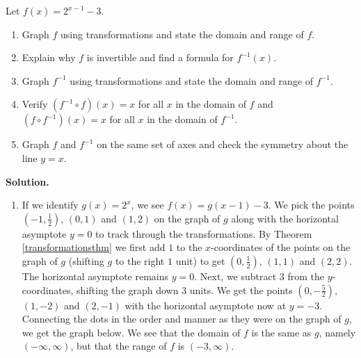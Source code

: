 \begin{ex}  Let $f(x) = 2^{x-1} - 3$. \label{proceduralinverse}

\begin{enumerate}

\item  Graph $f$ using transformations and state the domain and range of $f$.

\item  Explain why $f$ is invertible and find a formula for $f^{-1}(x)$.

\item  Graph $f^{-1}$ using transformations and state the domain and range of $f^{-1}$.

\item  Verify $\left(f^{-1} \circ f\right)(x) = x$ for all $x$ in the domain of $f$ and  $\left(f \circ f^{-1} \right)(x) = x$ for all $x$ in the domain of $f^{-1}$.

\item  Graph $f$ and $f^{-1}$ on the same set of axes and check the symmetry about the line $y = x$.

\end{enumerate}

{\bf Solution.}  

\begin{enumerate}

\item  If we identify $g(x) = 2^{x}$, we see $f(x) = g(x-1)-3$.  We pick the points $\left(-1, \frac{1}{2}\right)$, $(0,1)$ and $(1, 2)$ on the graph of $g$ along with the horizontal asymptote $y=0$ to track through the transformations. By Theorem \ref{transformationsthm} we first add $1$ to the $x$-coordinates of the points on the graph of $g$ (shifting $g$ to the right $1$ unit) to get $\left(0, \frac{1}{2}\right)$, $(1,1)$ and $(2, 2)$.  The horizontal asymptote remains $y=0$.  Next, we subtract $3$ from the $y$-coordinates, shifting the graph down $3$ units.  We get the points $\left(0, -\frac{5}{2}\right)$, $(1,-2)$ and $(2, -1)$ with the horizontal asymptote now at $y=-3$.  Connecting the dots in the order and manner as they were on the graph of $g$, we get the graph below.  We see that the domain of $f$ is the same as $g$, namely $(-\infty, \infty)$, but that the range of $f$ is $(-3, \infty)$.


\[\begin{array}{ccc}


\end{array}\]
\end{enumerate}
\end{ex}
